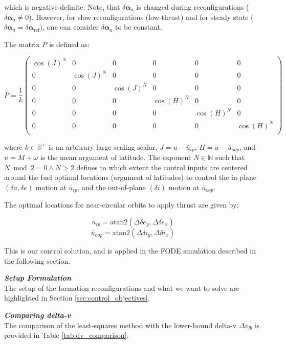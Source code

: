 which is negative definite. Note, that $\delta \boldsymbol{\alpha}_a$ is changed during reconfigurations ($\delta \boldsymbol{\alpha}_a \ne 0$). However, for slow reconfigurations (low-thrust) and for steady state ($\delta \boldsymbol{\alpha}_a = \delta \boldsymbol{\alpha}_{\text{ref}}$), one can consider $\delta \boldsymbol{\alpha}_a$ to be constant.

The matrix \( P \) is defined as:

\[
P = \frac{1}{k} \begin{pmatrix}
\cos(J)^N & 0 & 0 & 0 & 0 & 0 \\
0 & \cos(J)^N & 0 & 0 & 0 & 0 \\
0 & 0 & \cos(J)^N & 0 & 0 & 0 \\
0 & 0 & 0 & \cos(H)^N & 0 & 0 \\
0 & 0 & 0 & 0 & \cos(H)^N & 0 \\
0 & 0 & 0 & 0 & 0 & \cos(H)^N \\
\end{pmatrix}
\tag{4.4}
\]

where \( k \in \mathbb{R}^{+} \) is an arbitrary large scaling scalar, 
\( J = u - \bar{u}_{ip} \), \( H = u - \bar{u}_{oop} \), and 
\( u = M + \omega \) is the mean argument of latitude. 
The exponent \( N \in \mathbb{N} \) such that \( N \bmod 2 = 0 \land N > 2 \) 
defines to which extent the control inputs are centered around the fuel optimal 
locations (argument of latitudes) to control the in-plane 
\((\delta a, \delta e)\) motion at \( \bar{u}_{ip} \), and the out-of-plane 
\((\delta i)\) motion at \( \bar{u}_{oop} \).

The optimal locations for near-circular orbits to apply thrust are given by:

\[
\bar{u}_{ip} = \text{atan2} \left( \Delta \delta e_y, \Delta \delta e_x \right)
\tag{4.5}
\]
\[
\bar{u}_{oop} = \text{atan2} \left( \Delta \delta i_y, \Delta \delta i_x \right)
\tag{4.6}
\]



This is our control solution, and is applied in the FODE simulation described in the following section.

\textbf{\textit{Setup Formulation}} \\
The setup of the formation reconfigurations and what we want to solve are highlighted in Section \ref{sec:control_objectives}.

\textbf{\textit{Comparing delta-v}} \\
The comparison of the least-squares method with the lower-bound delta-v $\Delta v_{lb}$ is provided in Table \ref{tab:dv_comparison}.


